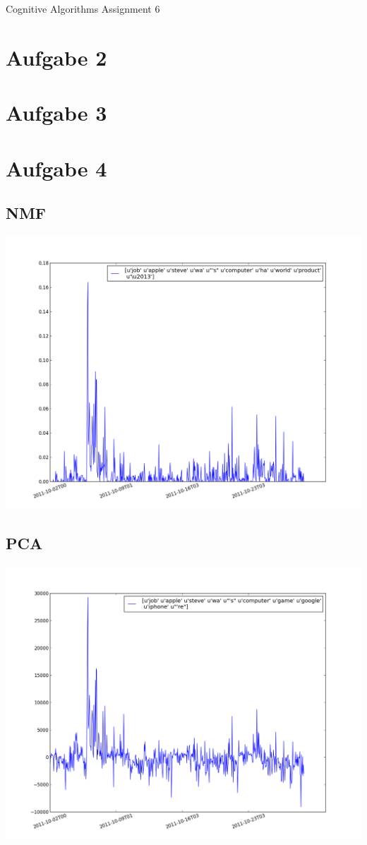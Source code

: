 \documentclass[a4paper,10pt]{article}
\begin{document}
\begin{center}
\Large{Cognitive Algorithms Assignment 6} \\
\end{center}

\section*{Aufgabe 2}
\section*{Aufgabe 3}
\section*{Aufgabe 4}

\subsection*{NMF}
\includegraphics[width=20cm]{nmf_exercise_4.png}

\subsection*{PCA}
\includegraphics[width=20cm]{pca_exercise_4.png}

		
\end{document}

